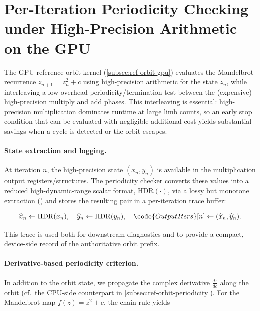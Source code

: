 \section{Per-Iteration Periodicity Checking under High-Precision Arithmetic on the GPU}
\label{sec:hp-periodicity}

The \FractalShark{} GPU reference-orbit kernel (\cref{subsec:ref-orbit-gpu}) evaluates the Mandelbrot recurrence
\(
z_{n+1} = z_n^2 + c
\)
using high-precision arithmetic for the state \(z_n\), while interleaving a
low-overhead periodicity/termination test between the (expensive) high-precision
multiply and add phases. This interleaving is essential: high-precision
multiplication dominates runtime at large limb counts, so an early stop
condition that can be evaluated with negligible additional cost yields
substantial savings when a cycle is detected or the orbit escapes.

\paragraph{State extraction and logging.}

At iteration \(n\), the high-precision state \((x_n, y_n)\) is available in the
multiplication output registers/structures. The periodicity checker converts
these values into a reduced high-dynamic-range scalar format,
\(\mathrm{HDR}(\cdot)\), via a lossy but monotone extraction
() and stores the resulting pair in a per-iteration trace
buffer:

\begin{equation}
  \widehat{x}_n \leftarrow \mathrm{HDR}(x_n), \quad
  \widehat{y}_n \leftarrow \mathrm{HDR}(y_n), \quad
  \code{OutputIters}[n] \leftarrow (\widehat{x}_n, \widehat{y}_n).
\end{equation}

This trace is used both for downstream diagnostics and to provide a compact,
device-side record of the authoritative orbit prefix.

\paragraph{Derivative-based periodicity criterion.}

In addition to the orbit state, we propagate the complex derivative
\(
\frac{dz}{dc}
\)
along the orbit (cf.\ the CPU-side counterpart in \cref{subsec:ref-orbit-periodicity}). For the Mandelbrot map \(f(z)=z^2+c\), the chain rule yields

